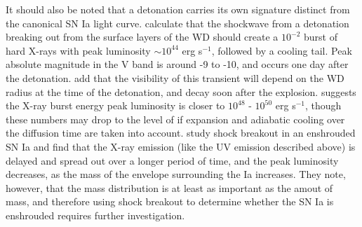 It should also be noted that a detonation carries its own signature distinct from the canonical SN Ia light curve.  \cite{pirocw10} calculate that the shockwave from a detonation breaking out from the surface layers of the WD should create a $10^{-2}$ burst of hard X-rays with peak luminosity $\sim 10^{44}$ erg s$^{-1}$, followed by a cooling tail.  Peak absolute magnitude in the V band is around -9 to -10, and occurs one day after the detonation.  \citeauthor{pirocw10} add that the visibility of this transient will depend on the WD radius at the time of the detonation, and {\Ni} decay soon after the explosion.  \cite{hofls09} suggests the X-ray burst energy peak luminosity is closer to $10^{48}$ - $10^{50}$ erg s$^{-1}$, though these numbers may drop to the level of \citeauthor{pirocw10} if expansion and adiabatic cooling over the diffusion time are taken into account.  \citeauthor{frye+10} study shock breakout in an enshrouded SN Ia and find that the X-ray emission (like the UV emission described above) is delayed and spread out over a longer period of time, and the peak luminosity decreases, as the mass of the envelope surrounding the Ia increases.  They note, however, that the mass distribution is at least as important as the amout of mass, and therefore using shock breakout to determine whether the SN Ia is enshrouded requires further investigation.


